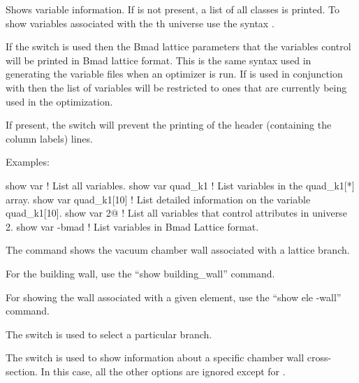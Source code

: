 {{{\begin{description}
{\vskip -0.1in 

Shows variable information. If  is not
present, a list of all  classes is printed. To show
variables associated with the th universe use the syntax
.

If the  switch is used then the Bmad lattice parameters that
the \tao variables control will be printed in Bmad lattice
format. This is the same syntax used in generating the variable files
when an optimizer is run. If  is used in conjunction with
 then the list of variables will be restricted to ones that
are currently being used in the optimization.

If present, the  switch will prevent the printing
of the header (containing the column labels) lines.

Examples:
\begin{example}
  show var             ! List all variables.
  show var quad_k1     ! List variables in the quad_k1[*] array.
  show var quad_k1[10] ! List detailed information on the variable quad_k1[10].
  show var 2@          ! List all variables that control attributes in universe 2.
  show var -bmad       ! List variables in Bmad Lattice format.
\end{example}


\vskip 0.1in

\item[\protect\parbox{6in}{
    show wall \{-branch <name>\}\{-section <index>\} \{-angle <angle>} \\
    \hspace*{0.35in} \{-s <s1>:<s2>\} \{<n1>:<n2>\}] \Newline

\vskip -0.1in 

The  command shows the vacuum chamber wall associated
with a lattice branch.

For the building wall, use the ``show building_wall'' command.

For showing the wall associated with a given element, use the ``show
ele -wall'' command.

The  switch is used to select a particular branch.

The  switch is used to show information about a specific
chamber wall cross-section. In this case, all the other options are
ignored except for .

}
\end{description}}}}
